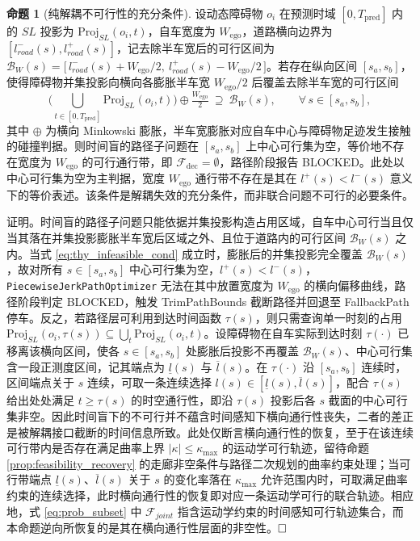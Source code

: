 \documentclass[a4paper,11pt]{ctexart}
\theoremstyle{definition}
\newtheorem{proposition}{命题}[section]
\begin{document}
\begin{proposition}[纯解耦不可行性的充分条件]
\label{prop:decoupled_infeasible}
设动态障碍物 $o_i$ 在预测时域 $[0, T_{\text{pred}}]$ 内的 $SL$ 投影为 $\mathrm{Proj}_{SL}(o_i, t)$，自车宽度为 $W_{\text{ego}}$，道路横向边界为 $[l_{road}^{-}(s), l_{road}^{+}(s)]$，记去除半车宽后的可行区间为 $\mathcal{B}_{W}(s) = \bigl[\, l_{road}^{-}(s) + W_{\text{ego}}/2,\ l_{road}^{+}(s) - W_{\text{ego}}/2 \,\bigr]$。若存在纵向区间 $[s_a, s_b]$，使得障碍物并集投影向横向各膨胀半车宽 $W_{\text{ego}}/2$ 后覆盖去除半车宽的可行区间
\begin{equation}
    \Big(\bigcup_{t \in [0, T_{\text{pred}}]} \mathrm{Proj}_{SL}(o_i, t)\Big) \oplus \tfrac{W_{\text{ego}}}{2}\ \supseteq\ \mathcal{B}_{W}(s), \qquad \forall\, s \in [s_a, s_b],
    \label{eq:thy_infeasible_cond}
\end{equation}
其中 $\oplus$ 为横向 Minkowski 膨胀，半车宽膨胀对应自车中心与障碍物足迹发生接触的碰撞判据。则时间盲的路径子问题在 $[s_a, s_b]$ 上中心可行集为空，等价地不存在宽度为 $W_{\text{ego}}$ 的可行通行带，即 $\mathcal{F}_{\text{dec}} = \emptyset$，路径阶段报告 BLOCKED。此处以中心可行集为空为主判据，宽度 $W_{\text{ego}}$ 通行带不存在是其在 $l^{+}(s) < l^{-}(s)$ 意义下的等价表述。该条件是解耦失效的充分条件，而非联合问题不可行的必要条件。
\end{proposition}

证明。时间盲的路径子问题只能依据并集投影构造占用区域，自车中心可行当且仅当其落在并集投影膨胀半车宽后区域之外、且位于道路内的可行区间 $\mathcal{B}_{W}(s)$ 之内。当式 \eqref{eq:thy_infeasible_cond} 成立时，膨胀后的并集投影完全覆盖 $\mathcal{B}_{W}(s)$，故对所有 $s \in [s_a, s_b]$ 中心可行集为空，$l^{+}(s) < l^{-}(s)$，\texttt{PiecewiseJerkPathOptimizer} 无法在其中放置宽度为 $W_{\text{ego}}$ 的横向偏移曲线，路径阶段判定 BLOCKED，触发 TrimPathBounds 截断路径并回退至 FallbackPath 停车。反之，若路径层可利用到达时间函数 $\tau(s)$，则只需查询单一时刻的占用 $\mathrm{Proj}_{SL}(o_i, \tau(s)) \subseteq \bigcup_t \mathrm{Proj}_{SL}(o_i, t)$。设障碍物在自车实际到达时刻 $\tau(\cdot)$ 已移离该横向区间，使各 $s \in [s_a, s_b]$ 处膨胀后投影不再覆盖 $\mathcal{B}_{W}(s)$、中心可行集含一段正测度区间，记其端点为 $\underline{l}(s)$ 与 $\overline{l}(s)$。在 $\tau(\cdot)$ 沿 $[s_a, s_b]$ 连续时，区间端点关于 $s$ 连续，可取一条连续选择 $l(s) \in [\underline{l}(s), \overline{l}(s)]$，配合 $\tau(s)$ 给出处处满足 $t \geq \tau(s)$ 的时空通行性，即沿 $\tau(s)$ 投影后各 $s$ 截面的中心可行集非空。因此时间盲下的不可行并不蕴含时间感知下横向通行性丧失，二者的差正是被解耦接口截断的时间信息所致。此处仅断言横向通行性的恢复，至于在该连续可行带内是否存在满足曲率上界 $|\kappa| \leq \kappa_{\max}$ 的运动学可行轨迹，留待命题 \ref{prop:feasibility_recovery} 的走廊非空条件与路径二次规划的曲率约束处理；当可行带端点 $\underline{l}(s)$、$\overline{l}(s)$ 关于 $s$ 的变化率落在 $\kappa_{\max}$ 允许范围内时，可取满足曲率约束的连续选择，此时横向通行性的恢复即对应一条运动学可行的联合轨迹。相应地，式 \eqref{eq:prob_subset} 中 $\mathcal{F}_{joint}$ 指含运动学约束的时间感知可行轨迹集合，而本命题逆向所恢复的是其在横向通行性层面的非空性。$\hfill\Box$
\end{document}
